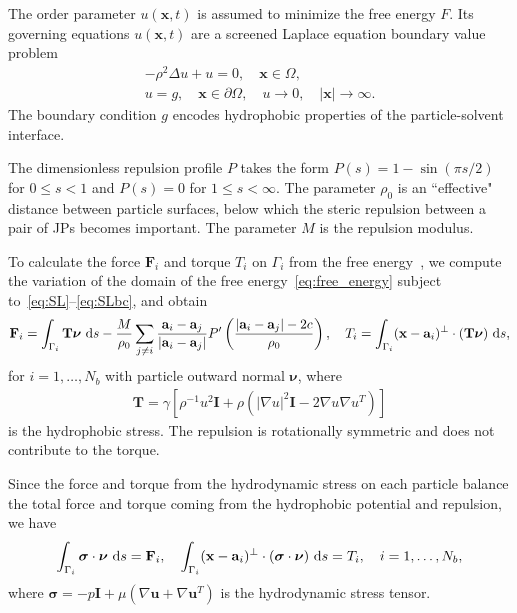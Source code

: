 \documentclass[prb,preprint,showpacs,preprintnumbers,amsmath,amssymb,longbibliography]{revtex4-1}
\renewcommand{\aa}{\mathbf{a}}
\newcommand{\bd}{\partial}
\newcommand{\FF}{\mathbf{F}}
\newcommand{\nnu}{\boldsymbol{\nu}}
\newcommand{\ssigma}{\boldsymbol{\sigma}}
\newcommand{\xx}{\mathbf{x}}
\newcommand{\uu}{\mathbf{u}}
\begin{document}
The order parameter $u(\xx,t)$ is assumed to minimize the free energy
$F$. Its governing equations $u(\xx,t)$ are a screened Laplace equation
boundary value problem
\begin{gather}
  \label{eq:SL}
  -\rho^2 \Delta u + u = 0,\quad \xx \in \Omega, \\
  \label{eq:SLbc}
  u = g, \quad \xx \in \bd\Omega, \quad 
  u \rightarrow 0, \quad |\xx| \rightarrow \infty.
\end{gather}
The boundary condition $g$ encodes hydrophobic properties of the
particle-solvent interface.

The dimensionless repulsion profile $P$ takes the form $P(s) = 1 -
\sin(\pi s/2)$ for $0 \leq s < 1$ and $P(s) = 0$ for $1 \leq s <
\infty$. The parameter $\rho_0$ is an ``effective" distance between
particle surfaces, below which the steric repulsion between a pair of
JPs becomes important. The parameter $M$ is the repulsion modulus.

To calculate the force $\FF_i$ and torque $T_i$ on $\Gamma_i$ from the
free energy~\cite{Fu20}, we compute the variation of the domain of the
free energy~\eqref{eq:free_energy} subject
to~\eqref{eq:SL}--\eqref{eq:SLbc}, and obtain 
\begin{align}
  \FF_i = \int_{\Gamma_i} \mathbf{T}\nnu \, \dif s
  - \frac{M}{\rho_0}
  \sum_{j \neq i}
  \frac{\aa_i - \aa_j}{|\aa_i - \aa_j|}
P'\left(\frac{|\aa_i - \aa_j|-2c}{\rho_0}\right)
  ,\quad
T_i = \int_{\Gamma_i} (\xx - \aa_i)^{\perp}\cdot (\mathbf{T}\nnu) \, \dif s, 
\end{align}
for $i = 1,\dots,N_b$ with particle outward normal $\nnu$, where
\begin{align}
\mathbf{T} = \gamma \left[ \rho^{-1} u^2 \mathbf{I}
  + \rho \left(|\nabla u|^2 \mathbf{I} - 2\nabla u \nabla u^T\right)\right]
\end{align}
is the hydrophobic stress. The repulsion is rotationally symmetric and
does not contribute to the torque.

Since the force and torque from the hydrodynamic stress on each particle
balance the total force and torque coming from the hydrophobic potential
and repulsion, we have
\begin{equation}
  \label{eq:force}
 \int_{\Gamma_i} \ssigma \cdot \nnu \, \dif s = \FF_i, \quad
 \int_{\Gamma_i} (\xx - \aa_i)^\perp \cdot 
  (\ssigma \cdot \nnu) \, \dif s = T_i,
  \quad i=1,\ldots,N_b,
\end{equation}
where $\ssigma = -p \mathbf{I} + \mu \left(\nabla \uu + \nabla \uu^T
\right)$ is the hydrodynamic stress tensor.
\end{document}
